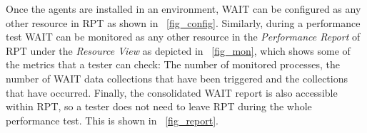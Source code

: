 \documentclass[runningheads,a4paper]{llncs}
\begin{document}
Once the agents are installed in an environment, WAIT can be configured as
any other resource in RPT as shown in \figurename ~\ref{fig_config}. Similarly,
during a performance test WAIT can be monitored as any other resource in the
\emph{Performance Report} of RPT under the \emph{Resource View} as depicted in
\figurename ~\ref{fig_mon}, which shows some of the metrics that a tester can
check: The number of monitored processes, the number of WAIT data collections
that have been triggered and the collections that have occurred. Finally, the
consolidated WAIT report is also accessible within RPT, so a tester does not
need to leave RPT during the whole performance test. This is shown in
\figurename ~\ref{fig_report}. 
\end{document}
